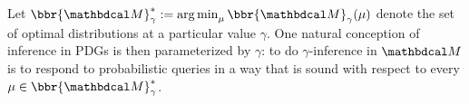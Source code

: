 \documentclass{article}
\begin{document}
Let $\bbr{\dg M}^*_\gamma := \argmin_\mu \bbr{\dg M}_\gamma(\mu)$ denote
the set of optimal distributions at a particular value $\gamma$.
%
%
%
One natural conception of inference in PDGs is then parameterized by $\gamma$:
to do $\gamma$-inference in $\dg M$ is to respond to probabilistic queries in a way that is sound with respect to every $\mu \in \bbr{\dg M}^*_\gamma$.
\end{document}
